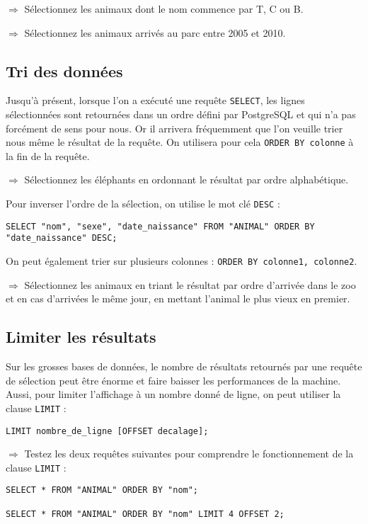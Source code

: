 \documentclass[11pt]{article}
\begin{document}
				$\Rightarrow$ Sélectionnez les animaux dont le nom commence par T, C ou B.
				
				$\Rightarrow$ Sélectionnez les animaux arrivés au parc entre 2005 et 2010.
			
			
			\subsection{Tri des données}
				Jusqu'à présent, lorsque l'on a exécuté une requête \lstinline{SELECT}, les lignes sélectionnées sont retournées dans un ordre défini par PostgreSQL et qui n'a pas forcément de sens pour nous. Or il arrivera fréquemment que l'on veuille trier nous même le résultat de la requête. On utilisera pour cela \lstinline{ORDER BY colonne} à la fin de la requête.
				
				$\Rightarrow$ Sélectionnez les éléphants en ordonnant le résultat par ordre alphabétique.
				
				Pour inverser l'ordre de la sélection, on utilise le mot clé \lstinline{DESC} :
				\begin{lstlisting}
SELECT "nom", "sexe", "date_naissance" FROM "ANIMAL" ORDER BY "date_naissance" DESC;
				\end{lstlisting}
				
				On peut également trier sur plusieurs colonnes : \lstinline{ORDER BY colonne1, colonne2}.
				
				$\Rightarrow$ Sélectionnez les animaux en triant le résultat par ordre d'arrivée dans le zoo et en cas d'arrivées le même jour, en mettant l'animal le plus vieux en premier.
				
			
			\subsection{Limiter les résultats}
				Sur les grosses bases de données, le nombre de résultats retournés par une requête de sélection peut être énorme et faire baisser les performances de la machine. Aussi, pour limiter l'affichage à un nombre donné de ligne, on peut utiliser la clause \lstinline{LIMIT} :
				\begin{lstlisting}
LIMIT nombre_de_ligne [OFFSET decalage];
				\end{lstlisting}
				
				$\Rightarrow$ Testez les deux requêtes suivantes pour comprendre le fonctionnement de la clause \lstinline{LIMIT} :
				\begin{lstlisting}
SELECT * FROM "ANIMAL" ORDER BY "nom";

SELECT * FROM "ANIMAL" ORDER BY "nom" LIMIT 4 OFFSET 2;
				\end{lstlisting}
			
\end{document}
